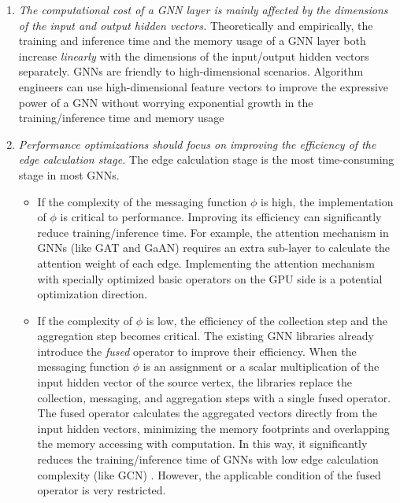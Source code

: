 \begin{enumerate}
    \item \emph{The computational cost of a GNN layer is mainly affected by the dimensions of the input and output hidden vectors.}
          Theoretically and empirically, the training and inference time and the memory usage of a GNN layer both increase \emph{linearly} with the dimensions of the input/output hidden vectors separately.
          GNNs are friendly to high-dimensional scenarios. 
          Algorithm engineers can use high-dimensional feature vectors to improve the expressive power of a GNN without worrying exponential growth in the training/inference time and memory usage
    \item \emph{Performance optimizations should focus on improving the efficiency of the edge calculation stage.}
          The edge calculation stage is the most time-consuming stage in most GNNs.
          \begin{itemize}
              \item If the complexity of the messaging function $\phi$ is high, the implementation of $\phi$ is critical to performance.
                    Improving its efficiency can significantly reduce training/inference time.
                    For example, the attention mechanism in GNNs (like GAT and GaAN) requires an extra sub-layer to calculate the attention weight of each edge.
                    Implementing the attention mechanism with specially optimized basic operators on the GPU side is a potential optimization direction.
              \item If the complexity of $\phi$ is low, the efficiency of the collection step and the aggregation step becomes critical.
                    The existing GNN libraries \cite{DGL, PyG, ma2019_neugraph} already introduce the \emph{fused} operator to improve their efficiency.
                    When the messaging function $\phi$ is an assignment or a scalar multiplication of the input hidden vector of the source vertex, the libraries replace the collection, messaging, and aggregation steps with a single fused operator.
                    The fused operator calculates the aggregated vectors directly from the input hidden vectors, minimizing the memory footprints and overlapping the memory accessing with computation.
                    In this way, it significantly reduces the training/inference time of GNNs with low edge calculation complexity (like GCN) \cite{yan2020_characterizing_gcn, zhang2020_analysis_neugraph}.
                    However, the applicable condition of the fused operator is very restricted.

\end{itemize}
\end{enumerate}
